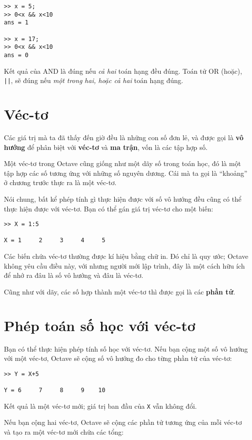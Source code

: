 \documentclass[12pt]{book}
\begin{document}
\begin{verbatim}
>> x = 5;
>> 0<x && x<10
ans = 1

>> x = 17;
>> 0<x && x<10
ans = 0
\end{verbatim}
%
Kết quả của AND là đúng nếu {\em cả hai} toán hạng đều đúng.
Toán tử OR (hoặc), {\tt ||}, sẽ đúng nếu 
{\em một trong hai, hoặc cả hai} toán hạng đúng.


\section{Véc-tơ}

Các giá trị mà ta đã thấy đến giờ đều là những con số đơn lẻ,
và được gọi là {\bf vô hướng} để phân biệt với {\bf véc-tơ}
và {\bf ma trận}, vốn là các tập hợp số.

Một véc-tơ trong Octave cũng giống như một dãy số trong
toán học, đó là một tập hợp các số tương ứng với những số
nguyên dương. Cái mà ta gọi là ``khoảng'' ở chương trước
thực ra là một véc-tơ.

Nói chung, bất kể phép tính gì thực hiện được với số vô hướng
đều cũng có thể thực hiện được với véc-tơ. Bạn có thể gán
giá trị véc-tơ cho một biến:

\begin{verbatim}
>> X = 1:5

X = 1     2     3     4     5
\end{verbatim}
%
Các biến chứa véc-tơ thường được kí hiệu bằng chữ in. Đó 
chỉ là quy ước; Octave không yêu cầu điều này, với nhưng người
mới lập trình, đây là một cách hữu ích để nhớ ra đâu là số vô hướng
và đâu là véc-tơ.

Cũng như với dãy, các số hợp thành một véc-tơ thì được gọi là các
{\bf phần tử}.


\section{Phép toán số học với véc-tơ}

Bạn có thể thực hiện phép tính số học với véc-tơ. Nếu bạn cộng
một số vô hướng với một véc-tơ, Octave sẽ cộng số vô hướng
đo cho từng phần tử của véc-tơ:

\begin{verbatim}
>> Y = X+5

Y = 6     7     8     9    10
\end{verbatim}
%
Kết quả là một véc-tơ mới; giá trị ban đầu của {\tt X} vẫn
không đổi.

Nếu bạn cộng hai véc-tơ, Octave sẽ cộng các phần tử tương ứng
của mỗi véc-tơ và tạo ra một véc-tơ mới chứa các tổng:
\end{document}
